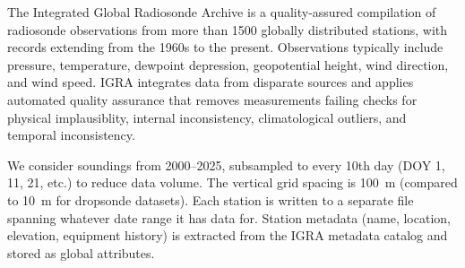 \documentclass[11pt]{article}
\begin{document}
The Integrated Global Radiosonde Archive \citep{durre2006} is a quality-assured compilation of radiosonde observations from more than 1500 globally distributed stations, with records extending from the 1960s to the present.  Observations typically include pressure, temperature, dewpoint depression, geopotential height, wind direction, and wind speed.  IGRA integrates data from disparate sources and applies automated quality assurance that removes measurements failing checks for physical implausiblity, internal inconsistency, climatological outliers, and temporal inconsistency.

We consider soundings from 2000--2025, subsampled to every 10th day (DOY 1, 11, 21, etc.) to reduce data volume.  The vertical grid spacing is \SI{100}{m} (compared to \SI{10}{m} for dropsonde datasets).  Each station is written to a separate file spanning whatever date range it has data for.  Station metadata (name, location, elevation, equipment history) is extracted from the IGRA metadata catalog and stored as global attributes.
\end{document}

